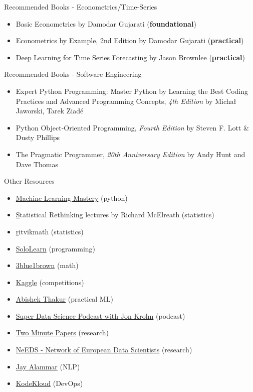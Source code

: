 \documentclass[compress,brown]{beamer}
\begin{document}
\begin{frame}{Recommended Books - Econometrics/Time-Series}
	\begin{itemize}
		\item Basic Econometrics by Damodar Gujarati (\textbf{foundational})
		\item Econometrics by Example, 2nd Edition by Damodar Gujarati (\textbf{practical})
		\item Deep Learning for Time Series Forecasting by Jason Brownlee (\textbf{practical})
	\end{itemize}
\end{frame}

\begin{frame}{Recommended Books - Software Engineering}
	\begin{itemize}
		\item Expert Python Programming: Master Python by Learning the Best Coding Practices and Advanced Programming Concepts, \textit{4th Edition} by Michał Jaworski, Tarek Ziadé
		\item Python Object-Oriented Programming, \textit{Fourth Edition} by Steven F. Lott \& Dusty Phillips
		\item The Pragmatic Programmer, \textit{20th Anniversary Edition} by Andy Hunt and Dave Thomas
	\end{itemize}
\end{frame}

\begin{frame}{Other Resources}
\begin{itemize}
	\item \href{https://machinelearningmastery.com/}{Machine Learning Mastery} (python)
	\item \href{https://www.youtube.com/channel/UCNJK6_DZvcMqNSzQdEkzvzA} Statistical Rethinking lectures by Richard McElreath (statistics)  	
	\item \href{https://www.youtube.com/c/ritvikmath} ritvikmath (statistics) 	
	\item \href{https://www.sololearn.com/home}{SoloLearn} (programming)
	\item \href{https://www.youtube.com/c/3blue1brown}{3blue1brown} (math)
	\item \href{https://www.kaggle.com/}{Kaggle} (competitions)
	\item \href{https://www.youtube.com/c/AbhishekThakurAbhi}{Abishek Thakur} (practical ML) 
	\item \href{https://www.youtube.com/c/SuperDataSciencePodcastwithJonKrohn}{Super Data Science Podcast with Jon Krohn} (podcast)
	\item \href{https://www.youtube.com/c/K\%C3\%A1rolyZsolnai}{Two Minute Papers} (research)
	\item \href{https://www.youtube.com/c/NeEDSNetworkofEuropeanDataScientists}{NeEDS - Network of European Data Scientists} (research)
	\item \href{https://www.youtube.com/channel/UCmOwsoHty5PrmE-3QhUBfPQ}{Jay Alammar} (NLP)
	\item \href{https://www.youtube.com/c/KodeKloud}{KodeKloud} (DevOps)
\end{itemize}
\end{frame}
\end{document}

